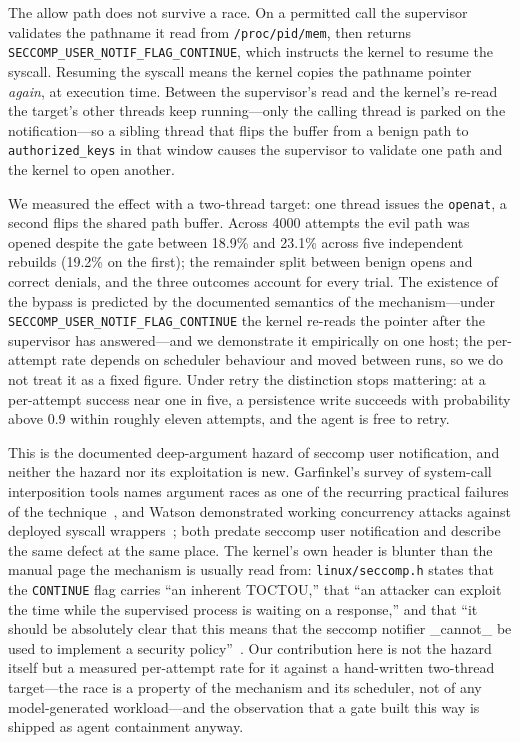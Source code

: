 \documentclass[11pt]{article}
\newcommand{\Nrace}{4000}
\newcommand{\RaceLo}{18.9}
\newcommand{\RaceHi}{23.1}
\begin{document}
The allow path does not survive a race. On a permitted call the supervisor validates the pathname it
read from \texttt{/proc/pid/mem}, then returns \texttt{SECCOMP\_USER\_NOTIF\_FLAG\_CONTINUE}, which
instructs the kernel to resume the syscall. Resuming the syscall means the kernel copies the pathname
pointer \emph{again}, at execution time. Between the supervisor's read and the kernel's re-read the
target's other threads keep running---only the calling thread is parked on the notification---so a
sibling thread that flips the buffer from a benign path to \texttt{authorized\_keys} in that window
causes the supervisor to validate one path and the kernel to open another.

We measured the effect with a two-thread target: one thread issues the \texttt{openat}, a second
flips the shared path buffer. Across \Nrace{} attempts the evil path was opened despite the gate
between \RaceLo\% and \RaceHi\% across five independent rebuilds (19.2\% on the first);
the remainder split
between benign opens and correct denials, and the three outcomes account for every trial. The
existence of the bypass is predicted by the documented semantics of the mechanism---under
\texttt{SECCOMP\_USER\_NOTIF\_FLAG\_CONTINUE} the kernel re-reads the pointer after the supervisor has
answered---and we demonstrate it empirically on one host; the per-attempt rate
depends on scheduler behaviour and moved between runs, so we do not treat it as a fixed figure. Under
retry the distinction stops mattering: at a per-attempt success near one in five, a persistence write
succeeds with probability above 0.9 within roughly eleven attempts, and the agent is free to retry.

This is the documented deep-argument hazard of seccomp user notification, and neither the hazard nor
its exploitation is new. Garfinkel's survey of system-call interposition tools names argument races as
one of the recurring practical failures of the technique~\cite{garfinkel03}, and Watson demonstrated
working concurrency attacks against deployed syscall wrappers~\cite{watson07}; both predate seccomp
user notification and describe the same defect at the same place. The kernel's own header is blunter
than the manual page the mechanism is usually read from: \texttt{linux/seccomp.h} states that the
\texttt{CONTINUE} flag carries ``an inherent TOCTOU,'' that ``an attacker can exploit the time while
the supervised process is waiting on a response,'' and that ``it should be absolutely clear that this
means that the seccomp notifier \_cannot\_ be used to implement a security policy''~\cite{seccompheader}.
Our contribution here is not the hazard itself but a measured per-attempt rate for it against a
hand-written two-thread target---the race is a property of the mechanism and its scheduler, not of any
model-generated workload---and the observation that a gate built this way is shipped as agent
containment anyway.
\end{document}
